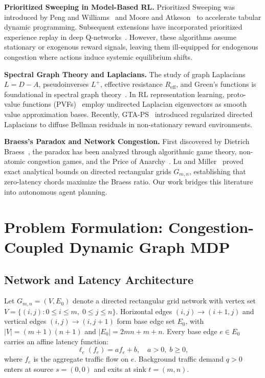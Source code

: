 \documentclass[11pt,a4paper]{article}
\begin{document}
\textbf{Prioritized Sweeping in Model-Based RL.}
Prioritized Sweeping was introduced by Peng and Williams~\cite{peng1993efficient} and Moore and Atkeson~\cite{moore1993prioritized} to accelerate tabular dynamic programming. Subsequent extensions have incorporated prioritized experience replay in deep Q-networks~\cite{schaul2015prioritized}. However, these algorithms assume stationary or exogenous reward signals, leaving them ill-equipped for endogenous congestion where actions induce systemic equilibrium shifts.

\textbf{Spectral Graph Theory and Laplacians.}
The study of graph Laplacians $L = D - A$, pseudoinverses $L^+$, effective resistance $R_{\text{eff}}$, and Green's functions is foundational in spectral graph theory~\cite{spielman2025sagt}. In RL representation learning, proto-value functions (PVFs)~\cite{mahadevan2007proto} employ undirected Laplacian eigenvectors as smooth value approximation bases. Recently, GTA-PS~\cite{gta_ps2025} introduced regularized directed Laplacians to diffuse Bellman residuals in non-stationary reward environments.

\textbf{Braess's Paradox and Network Congestion.}
First discovered by Dietrich Braess~\cite{braess1968paradoxon}, the paradox has been analyzed through algorithmic game theory, non-atomic congestion games, and the Price of Anarchy~\cite{roughgarden2002bad}. Lu and Miller~\cite{lu2026braess} proved exact analytical bounds on directed rectangular grids $G_{m,n}$, establishing that zero-latency chords maximize the Braess ratio. Our work bridges this literature into autonomous agent planning.

\section{Problem Formulation: Congestion-Coupled Dynamic Graph MDP}
\label{sec:formulation}

\subsection{Network and Latency Architecture}
Let $G_{m,n} = (V, E_0)$ denote a directed rectangular grid network with vertex set $V = \{(i, j) : 0 \le i \le m, \; 0 \le j \le n\}$. Horizontal edges $(i, j) \to (i+1, j)$ and vertical edges $(i, j) \to (i, j+1)$ form base edge set $E_0$, with $|V| = (m+1)(n+1)$ and $|E_0| = 2mn + m + n$. Every base edge $e \in E_0$ carries an affine latency function:
\begin{equation}
\ell_e(f_e) = a f_e + b, \quad a > 0, \; b \ge 0,
\end{equation}
where $f_e$ is the aggregate traffic flow on $e$. Background traffic demand $q > 0$ enters at source $s = (0, 0)$ and exits at sink $t = (m, n)$.
\end{document}
